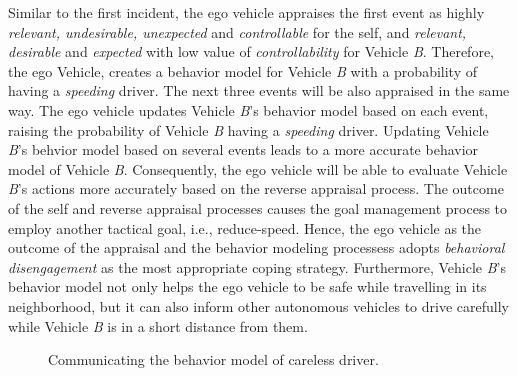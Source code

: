 \documentclass[journal, 11pt]{IEEEtran}
\begin{document}
Similar to the first incident, the ego vehicle appraises the first event as
highly \textit{relevant, undesirable, unexpected} and \textit{controllable} for
the self, and \textit{relevant, desirable} and \textit{expected} with low value
of \textit{controllability} for Vehicle \textit{B}. Therefore, the ego Vehicle,
creates a behavior model for Vehicle \textit{B} with a probability of having
a \textit{speeding} driver. The next three events will be also appraised in the
same way. The ego vehicle updates Vehicle \textit{B}'s behavior model based on
each event, raising the probability of Vehicle \textit{B} having a
\textit{speeding} driver. Updating Vehicle \textit{B}'s behvior model based on
several events leads to a more accurate behavior model of Vehicle \textit{B}.
Consequently, the ego vehicle will be able to evaluate Vehicle \textit{B}'s
actions more accurately based on the reverse appraisal process. The outcome of
the self and reverse appraisal processes causes the goal management process to
employ another tactical goal, i.e., reduce-speed. Hence, the ego vehicle as the
outcome of the appraisal and the behavior modeling processess adopts
\textit{behavioral disengagement} as the most appropriate coping strategy.
Furthermore, Vehicle \textit{B}'s behavior model not only helps the ego vehicle
to be safe while travelling in its neighborhood, but it can also inform other
autonomous vehicles to drive carefully while Vehicle \textit{B} is in a short
distance from them.

\begin{figure}[!t]
  \centerline{}
  \vspace*{-2mm}
  \caption{Communicating the behavior model of careless driver.}
  \label{fig:example3}
  \vspace*{-5mm}
\end{figure}
\end{document}
